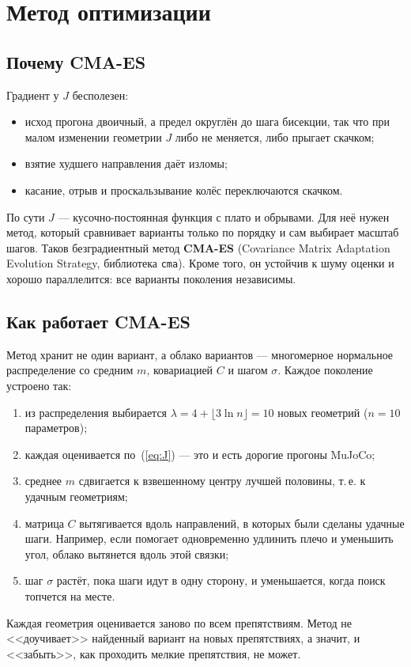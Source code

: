 \documentclass[11pt,a4paper]{article}
\begin{document}
\section{Метод оптимизации}

\subsection{Почему CMA-ES}

Градиент у $J$ бесполезен:
\begin{itemize}
  \item исход прогона двоичный, а предел округлён до шага бисекции, так что при малом изменении
        геометрии $J$ либо не меняется, либо прыгает скачком;
  \item взятие худшего направления даёт изломы;
  \item касание, отрыв и проскальзывание колёс переключаются скачком.
\end{itemize}
По сути $J$ --- кусочно-постоянная функция с плато и обрывами. Для неё нужен метод, который
сравнивает варианты только по порядку и сам выбирает масштаб шагов. Таков безградиентный
метод \textbf{CMA-ES} (Covariance Matrix Adaptation Evolution Strategy, библиотека \texttt{cma}).
Кроме того, он устойчив к шуму оценки и хорошо параллелится: все варианты поколения
независимы.

\subsection{Как работает CMA-ES}

Метод хранит не один вариант, а облако вариантов --- многомерное нормальное распределение
со средним $m$, ковариацией $C$ и шагом $\sigma$. Каждое поколение устроено так:
\begin{enumerate}
  \item из распределения выбирается $\lambda=4+\lfloor3\ln n\rfloor=10$ новых геометрий
        ($n=10$ параметров);
  \item каждая оценивается по~(\ref{eq:J}) --- это и есть дорогие прогоны MuJoCo;
  \item среднее $m$ сдвигается к взвешенному центру лучшей половины, т.\,е. к удачным геометриям;
  \item матрица $C$ вытягивается вдоль направлений, в которых были сделаны удачные шаги.
        Например, если помогает одновременно удлинить плечо и уменьшить угол, облако вытянется
        вдоль этой связки;
  \item шаг $\sigma$ растёт, пока шаги идут в одну сторону, и уменьшается, когда поиск
        топчется на месте.
\end{enumerate}
Каждая геометрия оценивается заново по всем препятствиям. Метод не <<доучивает>> найденный
вариант на новых препятствиях, а значит, и <<забыть>>, как проходить мелкие препятствия, не может.
\end{document}
